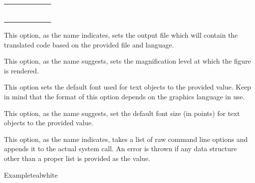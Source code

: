 \begin{description}
\begin{description}
\bigskip

{\centering
\def\arraystretch{1.5}
\begin{tabularx}{0.8\textwidth}{YYYYYY}
 &  &  &
 &  & \\
 &  &  &
 &  & \\
 &  &  &
 &  & \\
 &  &  &
 &  & \\
 &  &  &
 &  & \\
 &  &  &
 &  & 
\end{tabularx}\par}

\bigskip

\item[\abox{output}~\rqbox] This option, as the name indicates, sets the output file which will contain the translated code based on the provided file and language.

\item[\abox{magnification}] This option, as the name suggests, sets the magnification level at which the figure is rendered.

\item[\abox{font}] This option sets the default font used for text objects to the provided value. Keep in mind that the format of this option depends on the graphics language in use.

\item[\abox{size}] This option, as the name suggests, set the default font size (in points) for text objects to the provided value.

\item[\abox{options}] This option, as the name indicates, takes a list of raw command line options and appends it to the actual system call. An error is thrown if any data structure other than a proper list is provided as the value.
\end{description}

\begin{codebox}{Example}{teal}{\icnote}{white}
\end{codebox}


\end{description}
